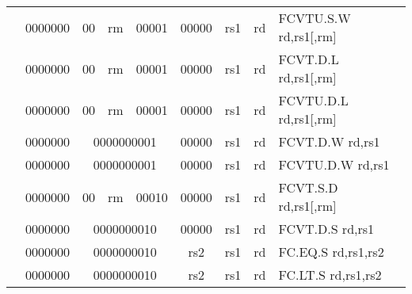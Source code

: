 \begin{table}[p]
\begin{small}
\begin{center}
\begin{tabular}{rcccccccccl}
&
\multicolumn{1}{|c|}{0000000} &
\multicolumn{1}{c|}{00} &
\multicolumn{2}{c|}{rm} &
\multicolumn{2}{c|}{00001} &
\multicolumn{1}{c|}{00000} &
\multicolumn{1}{c|}{rs1} &
\multicolumn{1}{c|}{rd} & FCVTU.S.W rd,rs1[,rm] \\
\cline{2-10}
  

&
\multicolumn{1}{|c|}{0000000} &
\multicolumn{1}{c|}{00} &
\multicolumn{2}{c|}{rm} &
\multicolumn{2}{c|}{00001} &
\multicolumn{1}{c|}{00000} &
\multicolumn{1}{c|}{rs1} &
\multicolumn{1}{c|}{rd} & FCVT.D.L rd,rs1[,rm] \\
\cline{2-10}
  

&
\multicolumn{1}{|c|}{0000000} &
\multicolumn{1}{c|}{00} &
\multicolumn{2}{c|}{rm} &
\multicolumn{2}{c|}{00001} &
\multicolumn{1}{c|}{00000} &
\multicolumn{1}{c|}{rs1} &
\multicolumn{1}{c|}{rd} & FCVTU.D.L rd,rs1[,rm] \\
\cline{2-10}
  

&
\multicolumn{1}{|c|}{0000000} &
\multicolumn{5}{c|}{0000000001} &
\multicolumn{1}{c|}{00000} &
\multicolumn{1}{c|}{rs1} &
\multicolumn{1}{c|}{rd} & FCVT.D.W rd,rs1 \\
\cline{2-10}
  

&
\multicolumn{1}{|c|}{0000000} &
\multicolumn{5}{c|}{0000000001} &
\multicolumn{1}{c|}{00000} &
\multicolumn{1}{c|}{rs1} &
\multicolumn{1}{c|}{rd} & FCVTU.D.W rd,rs1 \\
\cline{2-10}
  

&
\multicolumn{1}{|c|}{0000000} &
\multicolumn{1}{c|}{00} &
\multicolumn{2}{c|}{rm} &
\multicolumn{2}{c|}{00010} &
\multicolumn{1}{c|}{00000} &
\multicolumn{1}{c|}{rs1} &
\multicolumn{1}{c|}{rd} & FCVT.S.D rd,rs1[,rm] \\
\cline{2-10}
  

&
\multicolumn{1}{|c|}{0000000} &
\multicolumn{5}{c|}{0000000010} &
\multicolumn{1}{c|}{00000} &
\multicolumn{1}{c|}{rs1} &
\multicolumn{1}{c|}{rd} & FCVT.D.S rd,rs1 \\
\cline{2-10}
  

&
\multicolumn{1}{|c|}{0000000} &
\multicolumn{5}{c|}{0000000010} &
\multicolumn{1}{c|}{rs2} &
\multicolumn{1}{c|}{rs1} &
\multicolumn{1}{c|}{rd} & FC.EQ.S rd,rs1,rs2 \\
\cline{2-10}
  

&
\multicolumn{1}{|c|}{0000000} &
\multicolumn{5}{c|}{0000000010} &
\multicolumn{1}{c|}{rs2} &
\multicolumn{1}{c|}{rs1} &
\multicolumn{1}{c|}{rd} & FC.LT.S rd,rs1,rs2 \\
\cline{2-10}
  


\end{tabular}
\end{center}
\end{small}
\end{table}
